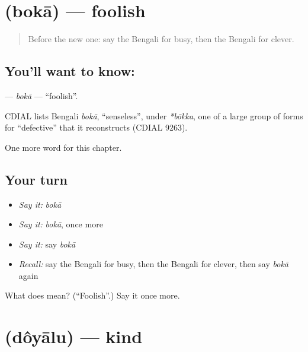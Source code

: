 \section[\texorpdfstring{\bn{বোকা} (bokā)}{বোকা (bokā)}]{ (bokā) — foolish}

\label{lesson:BN-C138-boka}



\begin{quote}
Before the new one: say the Bengali for busy, then the Bengali for clever.
\end{quote}

\subsection*{You'll want to know: }
\textbf{} — \emph{bokā} — \textquotedblleft{}foolish\textquotedblright{}.

\begin{cousinweb}
CDIAL lists Bengali \emph{bokā}, \textquotedblleft{}senseless\textquotedblright{}, under \emph{*bōkka}, one of a large group of forms for \textquotedblleft{}defective\textquotedblright{} that it reconstructs (CDIAL 9263).
\end{cousinweb}

\begin{grammarlens}[title={What you've built}]
One more word for this chapter.
\end{grammarlens}

\subsection*{Your turn}
\begin{itemize}
\raggedright
  \item \emph{Say it:} \emph{bokā}
  \item \emph{Say it:} \emph{bokā}, once more
  \item \emph{Say it:} say \emph{bokā}
  \item \emph{Recall:} say the Bengali for busy, then the Bengali for clever, then say \emph{bokā} again
\end{itemize}

\begin{tcolorbox}[breakable,colback=teal!4,colframe=teal!35!black,title={Before you move on}]
What does  mean? (\textquotedblleft{}Foolish\textquotedblright{}.) Say it once more.
\end{tcolorbox}
\section[\texorpdfstring{\bn{দয়ালু} (dôyālu)}{দয়ালু (dôyālu)}]{ (dôyālu) — kind}

